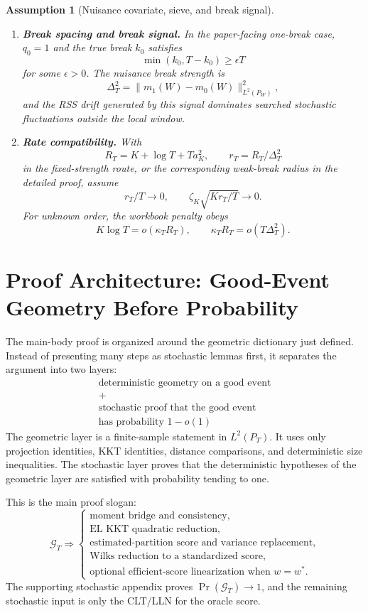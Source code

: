 \documentclass[12pt]{article}
\numberwithin{equation}{section}
\newtheorem{assumption}{Assumption}
\theoremstyle{definition}
\begin{document}
\begin{assumption}[Nuisance covariate, sieve, and break signal]
\begin{enumerate}[leftmargin=2em]
\item \textbf{Break spacing and break signal.} In the paper-facing one-break
case, \(q_0=1\) and the true break \(k_0\) satisfies
\[
    \min(k_0,T-k_0)\ge\epsilon T
\]
for some \(\epsilon>0\). The nuisance break strength is
\[
    \Delta_T^2
    =\|m_1(W)-m_0(W)\|_{L^2(P_W)}^2,
\]
and the RSS drift generated by this signal dominates searched stochastic
fluctuations outside the local window.

\item \textbf{Rate compatibility.} With
\[
    R_T=K+\log T+Ta_K^2,
    \qquad
    r_T=R_T/\Delta_T^2
\]
in the fixed-strength route, or the corresponding weak-break radius in the
detailed proof, assume
\[
    r_T/T\to0,
    \qquad
    \zeta_K\sqrt{Kr_T/T}\to0.
\]
For unknown order, the workbook penalty obeys
\[
    K\log T=o(\kappa_T R_T),
    \qquad
    \kappa_T R_T=o(T\Delta_T^2).
\]
\end{enumerate}
\end{assumption}

\section{Proof Architecture: Good-Event Geometry Before Probability}

The main-body proof is organized around the geometric dictionary just defined. Instead
of presenting many steps as stochastic lemmas first, it separates the argument
into two layers:
\[
\begin{array}{c}
    \text{deterministic geometry on a good event}\\[3pt]
    +\\[3pt]
    \text{stochastic proof that the good event}\\
    \text{has probability }1-o(1)
\end{array}
\]
The geometric layer is a finite-sample statement in \(L^2(P_T)\). It uses only
projection identities, KKT identities, distance comparisons, and deterministic
size inequalities. The stochastic layer proves that the deterministic hypotheses
of the geometric layer are satisfied with probability tending to one.

This is the main proof slogan:
\[
    \mathcal G_T
    \Longrightarrow
    \left\{
    \begin{array}{l}
    \text{moment bridge and consistency},\\
    \text{EL KKT quadratic reduction},\\
    \text{estimated-partition score and variance replacement},\\
    \text{Wilks reduction to a standardized score},\\
    \text{optional efficient-score linearization when }w=w^*.
    \end{array}
    \right.
\]
The supporting stochastic appendix proves \(\Pr(\mathcal G_T)\to1\), and the remaining stochastic
input is only the CLT/LLN for the oracle score.
\end{document}
